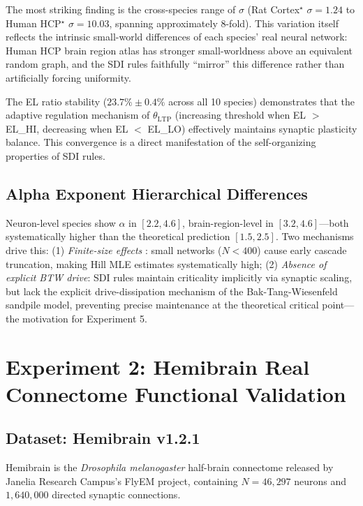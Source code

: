 \documentclass[12pt,a4paper]{article}
\begin{document}
The most striking finding is the cross-species range of $\sigma$ (Rat Cortex$^\star$ $\sigma=1.24$ to Human HCP$^\star$ $\sigma=10.03$, spanning approximately 8-fold). This variation itself reflects the intrinsic small-world differences of each species' real neural network: Human HCP brain region atlas has stronger small-worldness above an equivalent random graph, and the SDI rules faithfully ``mirror'' this difference rather than artificially forcing uniformity.

The EL ratio stability ($23.7\%\pm0.4\%$ across all 10 species) demonstrates that the adaptive regulation mechanism of $\theta_{\text{LTP}}$ (increasing threshold when EL $>$ EL\_HI, decreasing when EL $<$ EL\_LO) effectively maintains synaptic plasticity balance. This convergence is a direct manifestation of the self-organizing properties of SDI rules.

\subsection{Alpha Exponent Hierarchical Differences}

Neuron-level species show $\alpha$ in $[2.2, 4.6]$, brain-region-level in $[3.2, 4.6]$---both systematically higher than the theoretical prediction $[1.5, 2.5]$. Two mechanisms drive this: (1) \emph{Finite-size effects} \citep{clauset2009}: small networks ($N < 400$) cause early cascade truncation, making Hill MLE estimates systematically high; (2) \emph{Absence of explicit BTW drive}: SDI rules maintain criticality implicitly via synaptic scaling, but lack the explicit drive-dissipation mechanism of the Bak-Tang-Wiesenfeld sandpile model, preventing precise maintenance at the theoretical critical point---the motivation for Experiment 5.

\section{Experiment 2: Hemibrain Real Connectome Functional Validation}

\subsection{Dataset: Hemibrain v1.2.1}

Hemibrain \citep{xu2020} is the \textit{Drosophila melanogaster} half-brain connectome released by Janelia Research Campus's FlyEM project, containing $N=46{,}297$ neurons and $1{,}640{,}000$ directed synaptic connections.
\end{document}
